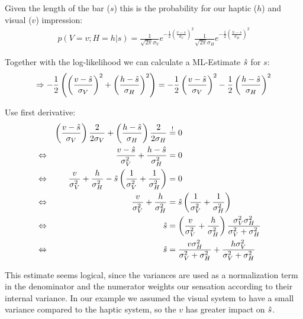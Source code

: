 \documentclass[../main/Notes.tex]{subfiles}
\begin{document}
Given the length of the bar ($s$) this is the probability for our haptic ($h$) and visual ($v$) impression:
\smallskip
\begin{align*}
p\left(V=v;H=h|s\right)=\frac{1}{\sqrt{2\pi}\sigma_{V}}e^{-\frac{1}{2}\left(\frac{v-s}{\sigma_{V}}\right)^{2}}\frac{1}{\sqrt{2\pi}\sigma_{H}}e^{-\frac{1}{2}\left(\frac{h-s}{\sigma_{H}}\right)^{2}}
\end{align*}

Together with the log-likelihood we can calculate a ML-Estimate $\est{s}$ for $s$:
\begin{align*}
\Rightarrow -\frac{1}{2}\left(\left(\frac{v-\est{s}}{\sigma_{V}}\right)^{2} + \left(\frac{h-\est{s}}{\sigma_{H}}\right)^{2}\right) = -\frac{1}{2}\left(\frac{v-\est{s}}{\sigma_{V}}\right)^{2} -\frac{1}{2} \left(\frac{h-\est{s}}{\sigma_{H}}\right)^{2}
\end{align*}

\begin{samepage}
Use first derivative:
\begin{align*}
                & & \left(\frac{v-\est{s}}{\sigma_{V}}\right) \frac{2}{2\sigma_{V}} + \left(\frac{h-\est{s}}{\sigma_{H}}\right) \frac{2}{2\sigma_{H}} & \stackrel{!}{=}0 & & \\
\Leftrightarrow & & \frac{v-\est{s}}{\sigma_{V}^{2}} + \frac{h-\est{s}}{\sigma_{H}^{2}} & = 0 & & \\
\Leftrightarrow & & \frac{v}{\sigma_{V}^{2}} + \frac{h}{\sigma_{H}^{2}} -\est{s} \left(\frac{1}{\sigma_{V}^{2}} + \frac{1}{\sigma_{H}^{2}}\right) & = 0 & & \\
\Leftrightarrow & & \frac{v}{\sigma_{V}^{2}} + \frac{h}{\sigma_{H}^{2}} & = \est{s} \left(\frac{1}{\sigma_{V}^{2}} + \frac{1}{\sigma_{H}^{2}}\right) & & \\
\Leftrightarrow & & \est{s} & = \left(\frac{v}{\sigma_{V}^{2}} + \frac{h}{\sigma_{H}^{2}}\right) \frac{\sigma_{V}^{2}\sigma_{H}^{2}}{\sigma_{V}^{2} + \sigma_{H}^{2}} & & \\
\Leftrightarrow & & \est{s} & = \frac{v\sigma_{H}^{2}}{\sigma_{V}^{2} + \sigma_{H}^{2}} + \frac{h\sigma_{V}^{2}}{\sigma_{V}^{2} + \sigma_{H}^{2}} & &
\end{align*}
\end{samepage}

This estimate seems logical, since the variances are used as a normalization term in the denominator and the numerator weights our sensation according to their internal variance. In our example we assumed the visual system to have a small variance compared to the haptic system, so the $v$ has greater impact on $\est{s}$.
\end{document}
